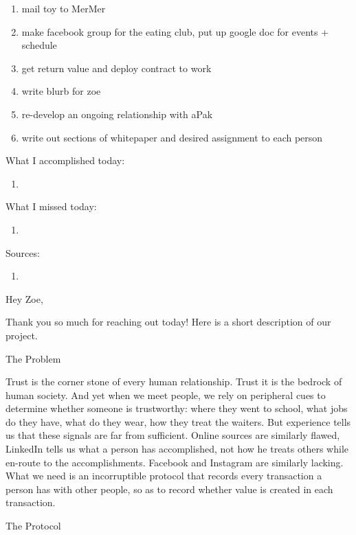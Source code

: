 \begin{enumerate}
	\item mail toy to MerMer
	\item make facebook group for the eating club, put up google doc for events + schedule
	\item get return value and deploy contract to work
	\item write blurb for zoe
	\item re-develop an ongoing relationship with aPak
	\item write out sections of whitepaper and desired assignment to each person
\end{enumerate}

What I accomplished today:

\begin{enumerate}
	\item 
\end{enumerate}

What I missed today:

\begin{enumerate}
	\item 
\end{enumerate}


Sources:

\begin{enumerate}
	\item 
\end{enumerate}


Hey Zoe,

Thank you so much for reaching out today! Here is a short description of our project. 

The Problem
 
Trust is the corner stone of every human relationship. Trust it is the bedrock of human society.  And yet when we meet people, we rely on peripheral cues to determine whether someone is trustworthy: where they went to school, what jobs do they have, what do they wear, how they treat the waiters. But experience tells us that these signals are far from sufficient. Online sources are similarly flawed, LinkedIn tells us what a person has accomplished, not how he treats others while en-route to the accomplishments. Facebook and Instagram are similarly lacking.  What we need is an incorruptible protocol that records every transaction a person has with other people, so as to record whether value is created in each transaction. 

The Protocol 

